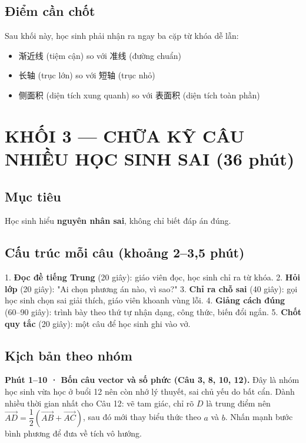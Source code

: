\documentclass[11pt, a4paper]{article}
\begin{document}
\subsection{Điểm cần chốt}

Sau khối này, học sinh phải nhận ra ngay ba cặp từ khóa dễ lẫn:

\begin{itemize}[leftmargin=1.4em, itemsep=2pt]
\item 渐近线 (tiệm cận) so với 准线 (đường chuẩn)
\item 长轴 (trục lớn) so với 短轴 (trục nhỏ)
\item 侧面积 (diện tích xung quanh) so với 表面积 (diện tích toàn phần)
\end{itemize}

\section{KHỐI 3 — CHỮA KỸ CÂU NHIỀU HỌC SINH SAI (36 phút)}

\subsection{Mục tiêu}

Học sinh hiểu \textbf{nguyên nhân sai}, không chỉ biết đáp án đúng.

\subsection{Cấu trúc mỗi câu (khoảng 2–3,5 phút)}

1. \textbf{Đọc đề tiếng Trung} (20 giây): giáo viên đọc, học sinh chỉ ra từ khóa.
2. \textbf{Hỏi lớp} (20 giây): "Ai chọn phương án nào, vì sao?"
3. \textbf{Chỉ ra chỗ sai} (40 giây): gọi học sinh chọn sai giải thích, giáo viên khoanh vùng lỗi.
4. \textbf{Giảng cách đúng} (60–90 giây): trình bày theo thứ tự nhận dạng, công thức, biến đổi ngắn.
5. \textbf{Chốt quy tắc} (20 giây): một câu để học sinh ghi vào vở.

\subsection{Kịch bản theo nhóm}

\textbf{Phút 1–10 · Bốn câu vector và số phức (Câu 3, 8, 10, 12).} Đây là nhóm học sinh vừa học ở buổi 12 nên còn nhớ lý thuyết, sai chủ yếu do bất cẩn. Dành nhiều thời gian nhất cho Câu 12: vẽ tam giác, chỉ rõ $D$ là trung điểm nên $\overrightarrow{AD}=\dfrac{1}{2}(\overrightarrow{AB}+\overrightarrow{AC})$, sau đó mới thay biểu thức theo $a$ và $b$. Nhấn mạnh bước bình phương để đưa về tích vô hướng.
\end{document}
